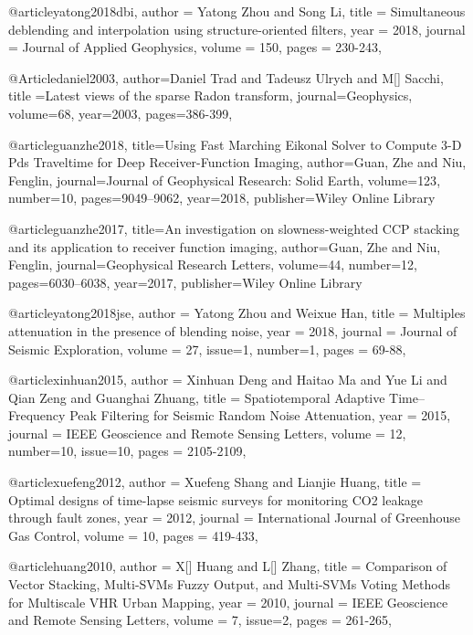 @article{yatong2018dbi,
  author =	 {Yatong Zhou and Song Li},
  title =	 {Simultaneous deblending and interpolation using structure-oriented filters},
  year =	 2018,
  journal =	 {Journal of Applied Geophysics},
  volume =	 150,
  pages =	 {230-243},
}

@Article{daniel2003,
  author={Daniel Trad and Tadeusz Ulrych and M[] Sacchi},
  title ={Latest views of the sparse {R}adon transform},
  journal={Geophysics},
  volume=68,
  year=2003,
  pages={386-399},
}

@article{guanzhe2018,
  title={Using Fast Marching Eikonal Solver to Compute 3-D Pds Traveltime for Deep Receiver-Function Imaging},
  author={Guan, Zhe and Niu, Fenglin},
  journal={Journal of Geophysical Research: Solid Earth},
  volume={123},
  number={10},
  pages={9049--9062},
  year={2018},
  publisher={Wiley Online Library}
}

@article{guanzhe2017,
  title={An investigation on slowness-weighted CCP stacking and its application to receiver function imaging},
  author={Guan, Zhe and Niu, Fenglin},
  journal={Geophysical Research Letters},
  volume={44},
  number={12},
  pages={6030--6038},
  year={2017},
  publisher={Wiley Online Library}
}


@article{yatong2018jse,
  author =	 {Yatong Zhou and Weixue Han},
  title =	 {Multiples attenuation in the presence of blending noise},
  year =	 2018,
  journal =	 {Journal of Seismic Exploration},
  volume =	 27,
  issue=1,
  number=1,
  pages =	 {69-88},
}



@article{xinhuan2015,
  author =	 {Xinhuan Deng and Haitao Ma and Yue Li and Qian Zeng and Guanghai Zhuang},
  title =	 {Spatiotemporal Adaptive Time–Frequency Peak Filtering for Seismic Random Noise Attenuation},
  year =	 2015,
  journal =	 {IEEE Geoscience and Remote Sensing Letters},
  volume =	 12,
  number=10,
  issue=10,
  pages =	 {2105-2109},
}

@article{xuefeng2012,
  author =	 {Xuefeng Shang and Lianjie Huang},
  title =	 {Optimal designs of time-lapse seismic surveys for monitoring CO2 leakage
through fault zones},
  year =	 2012,
  journal =	 {International Journal of Greenhouse Gas Control},
  volume =	 10,
  pages =	 {419-433},
}


@article{huang2010,
  author =	 {X[] Huang and L[] Zhang},
  title =	 {Comparison of Vector Stacking, Multi-SVMs Fuzzy Output, and Multi-SVMs Voting Methods for Multiscale VHR Urban Mapping},
  year =	 2010,
  journal =	 {IEEE Geoscience and Remote Sensing Letters},
  volume =	 7,
  issue=2,
  pages =	 {261-265},
}


